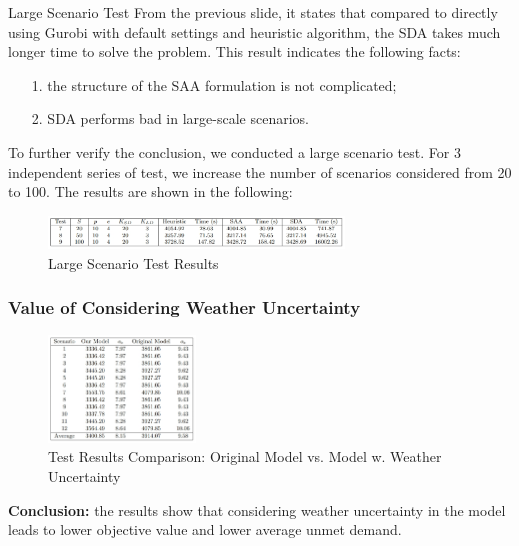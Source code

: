 \documentclass[aspectratio=169]{beamer}
\begin{document}
\begin{frame}{Large Scenario Test}
From the previous slide, it states that compared to directly using Gurobi with default settings and heuristic algorithm, the SDA takes much longer time to solve the problem. This result indicates the following facts:
\begin{itemize}
    \item[1.] the structure of the SAA formulation is not complicated;
    \item[2.] SDA performs bad in large-scale scenarios.  
\end{itemize}
To further verify the conclusion, we conducted a large scenario test. For 3 independent series of test, we increase the number of scenarios considered from 20 to 100. The results are shown in the following:
\begin{figure}
    \centering
    \includegraphics[width=0.7\textwidth]{fig_largeStest.png}
    \caption{Large Scenario Test Results}
    \label{fig:large_scenario}
\end{figure}
\end{frame}


\begin{frame}\frametitle{Value of Considering Weather Uncertainty}
\begin{figure}
    \centering
    \includegraphics[width=0.35\textwidth]{fig_value_wind_uncertainty.png}
    \caption{\small Test Results Comparison: Original Model vs. Model w. Weather Uncertainty}
    \label{fig:weather_uncertainty}
\end{figure}
\textbf{Conclusion:} the results show that considering weather uncertainty in the model leads to lower objective value and lower average unmet demand.

\end{frame}
\end{document}

